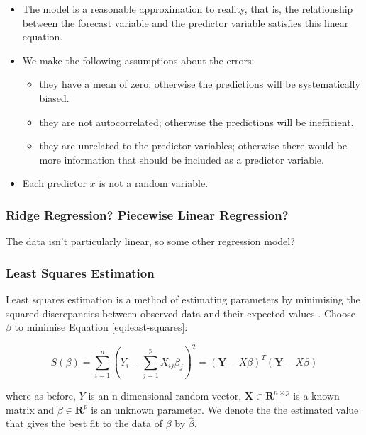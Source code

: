 \begin{itemize}
    \item The model is a reasonable approximation to reality, that is, the relationship between the forecast variable and the predictor variable satisfies this linear equation.
    \item We make the following assumptions about the errors:
    \begin{itemize}
        \item they have a mean of zero; otherwise the predictions will be systematically biased.
        \item they are not autocorrelated; otherwise the predictions will be inefficient.
        \item they are unrelated to the predictor variables; otherwise there would be more information that should be included as a predictor variable.
    \end{itemize}
    \item Each predictor $x$ is not a random variable.
\end{itemize}

\subsubsection{Ridge Regression? Piecewise Linear Regression?}

The data isn't particularly linear, so some other regression model?

\subsubsection{Least Squares Estimation}

Least squares estimation is a method of estimating parameters by minimising the squared discrepancies between observed data and their expected values \cite{least-squares-estimation}. Choose $\beta$ to minimise Equation \ref{eq:least-squares}:

\begin{equation}
    S(\beta) = \sum_{i=1}^n(Y_i - \sum_{j=1}^pX_{ij}\beta_j)^2 = (\mathbf{Y} - X\beta)^T(\mathbf{Y} - X\beta)
    \label{eq:least-squares}
\end{equation}

where as before, $Y$ is an n-dimensional random vector, $\mathbf{X} \in \mathbf{R} ^{n \times p}$ is a known matrix and $\beta \in \mathbf{R}^p$ is an unknown parameter. We denote the the estimated value that gives the best fit to the data of $\beta$ by $\hat \beta$.


